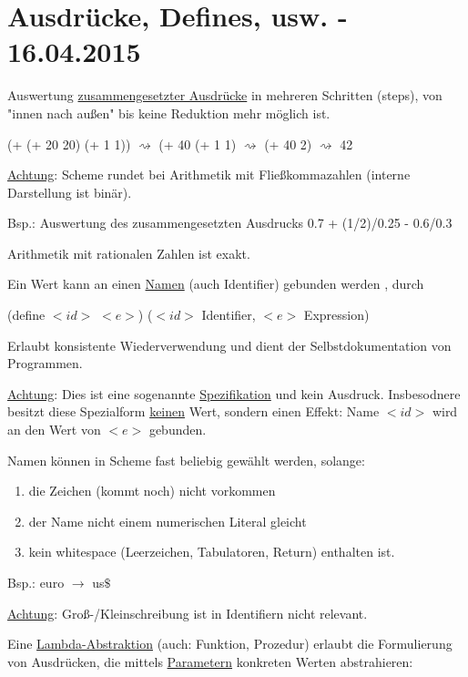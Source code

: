\documentclass[a4paper, 20pt, openany]{book}
\begin{document}
\chapter{Ausdrücke, Defines, usw. - 16.04.2015}

Auswertung \uline{zusammengesetzter Ausdrücke} in mehreren Schritten (steps), von "innen nach außen" bis keine Reduktion mehr möglich ist.

\begin{center}
(+ (+ 20 20) (+ 1 1)) $\rightsquigarrow$ (+ 40 (+ 1 1) $\rightsquigarrow$ (+ 40 2) $\rightsquigarrow$ 42
\end{center}

\uline{Achtung}: Scheme rundet bei Arithmetik mit Fließkommazahlen (interne Darstellung ist binär).

Bsp.: Auswertung des zusammengesetzten Ausdrucks 0.7 + (1/2)/0.25 - 0.6/0.3

Arithmetik mit rationalen Zahlen ist exakt.

Ein Wert kann an einen \uline{Namen} (auch Identifier) gebunden werden , durch

\begin{center}
(define $<id>$ $<e>$) ($<id>$ Identifier, $<e>$ Expression)
\end{center}

Erlaubt konsistente Wiederverwendung und dient der Selbstdokumentation von Programmen.

\uline{Achtung}: Dies ist eine sogenannte \uline{Spezifikation} und kein Ausdruck. Insbesodnere besitzt diese Spezialform \uline{keinen} Wert, sondern einen Effekt: Name $<id>$ wird an den Wert von $<e>$ gebunden.



Namen können in Scheme fast beliebig gewählt werden, solange:

\begin{enumerate}
\item die Zeichen (kommt noch) nicht vorkommen
\item der Name nicht einem numerischen Literal gleicht
\item kein whitespace (Leerzeichen, Tabulatoren, Return) enthalten ist.
\end{enumerate}

Bsp.: euro $\rightarrow$ us$\$$

\uline{Achtung}: Groß-/Kleinschreibung ist in Identifiern nicht relevant.

Eine \uline{Lambda-Abstraktion} (auch: Funktion, Prozedur) erlaubt die Formulierung von Ausdrücken, die mittels \uline{Parametern} konkreten Werten abstrahieren:
\end{document}
